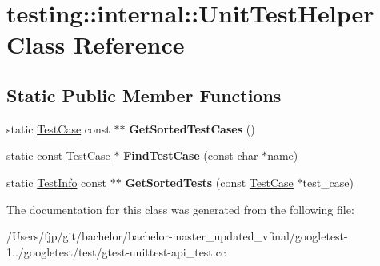 \hypertarget{classtesting_1_1internal_1_1_unit_test_helper}{}\section{testing\+:\+:internal\+:\+:Unit\+Test\+Helper Class Reference}
\label{classtesting_1_1internal_1_1_unit_test_helper}
\subsection*{Static Public Member Functions}
\begin{DoxyCompactItemize}
\item 
\mbox{\label{classtesting_1_1internal_1_1_unit_test_helper_a9a549307062083d10358638af272cc98}} 
static \mbox{\hyperlink{classtesting_1_1_test_case}{Test\+Case}} const  $\ast$$\ast$ {\bfseries Get\+Sorted\+Test\+Cases} ()
\item 
\mbox{\label{classtesting_1_1internal_1_1_unit_test_helper_a46303cbb7a6abb456f7b1350542113ac}} 
static const \mbox{\hyperlink{classtesting_1_1_test_case}{Test\+Case}} $\ast$ {\bfseries Find\+Test\+Case} (const char $\ast$name)
\item 
\mbox{\label{classtesting_1_1internal_1_1_unit_test_helper_a02602d22fb74566dad78c0c9d4f24e78}} 
static \mbox{\hyperlink{classtesting_1_1_test_info}{Test\+Info}} const  $\ast$$\ast$ {\bfseries Get\+Sorted\+Tests} (const \mbox{\hyperlink{classtesting_1_1_test_case}{Test\+Case}} $\ast$test\+\_\+case)
\end{DoxyCompactItemize}


The documentation for this class was generated from the following file\+:\begin{DoxyCompactItemize}
\item 
/\+Users/fjp/git/bachelor/bachelor-\/master\+\_\+updated\+\_\+vfinal/googletest-\/1../googletest/test/gtest-\/unittest-\/api\+\_\+test.\+cc\end{DoxyCompactItemize}
